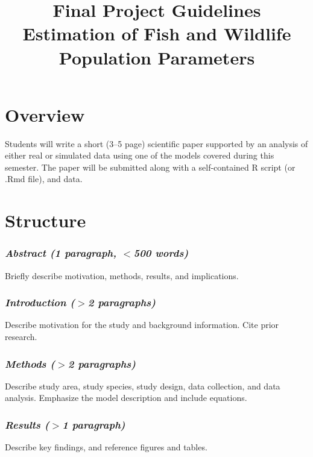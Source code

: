 \documentclass[12pt]{article}
\title{Final Project Guidelines \\ Estimation of Fish and Wildlife Population Parameters}%
\date{}
\begin{document}

\maketitle

\vspace{-48pt}

\section*{Overview}

Students will write a short (3--5 page) scientific paper supported by
an analysis of either real or simulated data using one of the models
covered during this semester. The paper will be submitted
along with a self-contained R script (or .Rmd file), and data.


\section*{Structure}

\subsubsection*{\it Abstract \normalfont (1 paragraph, $<$500 words)}
\vspace{-6pt}
Briefly describe motivation, methods, results, and
implications. %

\subsubsection*{\it Introduction \normalfont ($>$2 paragraphs)}
\vspace{-6pt}
Describe motivation for the study and background information. Cite
prior research. 

\subsubsection*{\it Methods \normalfont ($>$2 paragraphs)}
\vspace{-6pt}
Describe study area, study species, study design, data collection, and
data analysis. Emphasize the model description and include equations.

\subsubsection*{\it Results \normalfont ($>$1 paragraph)}
\vspace{-6pt}
Describe key findings, and reference figures and tables.
\end{document}
